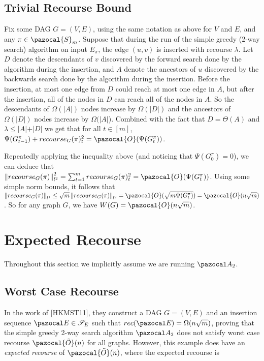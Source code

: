 \documentclass{article}
\newcommand{\norm}[1]{\left\lVert#1\right\rVert}
\begin{document}
\subsection{Trivial Recourse Bound}

Fix some DAG $G=(V,E)$, using the same notation as above for $V$ and $E$, and any $\pi \in \pazocal{S}_{m}$. Suppose that during the run of the simple greedy (2-way search) algorithm on input $E_{\pi}$, the edge $(u,v)$ is inserted with recourse $\lambda$. Let $D$ denote the descendants of $v$ discovered by the forward search done by the algorithm during the insertion, and $A$ denote the ancestors of $u$ discovered by the backwards search done by the algorithm during the insertion. Before the insertion, at most one edge from $D$ could reach at most one edge in $A$, but after the insertion, all of the nodes in $D$ can reach all of the nodes in $A$. So the descendants of $\Omega(\vert A \vert)$ nodes increase by $\Omega(\vert D\vert)$ and the ancestors of $\Omega(\vert D\vert)$ nodes increase by $\Omega(\vert A \vert$). Combined with the fact that $D = \Theta(A)$ and $\lambda \leq \vert A\vert + \vert D\vert$ we get that for all $t \in [m]$, $\Psi(G_{t-1}^{\pi}) + recourse_{G}(\pi)_{t}^{2} = \pazocal{O}(\Psi(G_{t}^{\pi}))$.

Repeatedly applying the inequality above (and noticing that $\Psi(G_{0}^{\pi})=0$), we can deduce that $\norm{recourse_{G}(\pi)}_{l^2}^{2} = \sum_{t=1}^{m}{recourse_{G}(\pi)^{2}_{t}} = \pazocal{O}(\Psi(G_{t}^{\pi}))$. Using some simple norm bounds, it follows that $\norm{recourse_{G}(\pi)}_{l^{1}} \leq \sqrt{m}\norm{recourse_{G}(\pi)}_{l^{2}} = \pazocal{O}(\sqrt{m\Psi(G_{t}^{\pi})}) = \pazocal{O}(n\sqrt{m})$. So for any graph $G$, we have $W(G)=\pazocal{O}(n\sqrt{m})$.

\section{Expected Recourse}

Throughout this section we implicitly assume we are running $\pazocal A_2$.

\subsection{Worst Case Recourse}

In the work of [HKMST11], they construct a DAG $G=(V,E)$ and an insertion sequence $\pazocal E \in \mathcal{S}_{E}$ such that $rec(\pazocal E) = \Omega(n\sqrt{m})$, proving that the simple greedy 2-way search algorithm $\pazocal A_2$ does not satisfy worst case recourse $\pazocal{\tilde{O}}(n)$ for all graphs. However, this example does have an \textit{expected recourse} of $\pazocal{\tilde{O}}(n)$, where the expected recourse is
\end{document}
